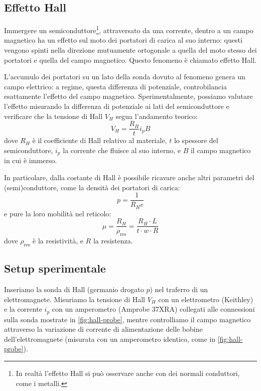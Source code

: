 
\subsection{Effetto Hall}

Immergere un semiconduttore\footnote{In realtà l'effetto Hall si può osservare anche con dei normali conduttori, come i metalli.}, attraversato da una corrente, dentro a un campo magnetico ha un effetto sul moto dei portatori di carica al suo interno: questi vengono spinti nella direzione mutuamente ortogonale a quella del moto stesso dei portatori e quella del campo magnetico.
Questo fenomeno è chiamato effetto Hall.

L'accumulo dei portatori su un lato della sonda dovuto al fenomeno genera un campo elettrico: a regime, questa differenza di potenziale, controbilancia esattamente l'effetto del campo magnetico.
Sperimentalmente, possiamo valutare l'effetto misurando la differenza di potenziale ai lati del semiconduttore e verificare che la tensione di Hall $ V_H $ segua l'andamento teorico:
\begin{equation} \label{eq:hall-tension}
V_H = \frac{R_H}{t} i_p B
\end{equation}
dove $ R_H $ è il coefficiente di Hall relativo al materiale, $ t $ lo spessore del semiconduttore, $ i_p $ la corrente che fluisce al suo interno, e $ B $ il campo magnetico in cui è immerso.

In particolare, dalla costante di Hall è possibile ricavare anche altri parametri del (semi)conduttore, come la densità dei portatori di carica:
\begin{equation}\label{eq:charge-density}
p = \frac{1}{R_H e}
\end{equation}
e pure la loro mobilità nel reticolo:
\begin{equation} \label{eq:charge-mobility}
\mu = \frac{R_H}{\rho_\text{res}} = \frac{R_H \cdot L}{t \cdot w \cdot R}
\end{equation}
dove $ \rho_\text{res} $ è la resistività, e $ R $ la resistenza.

\subsection{Setup sperimentale}

Inseriamo la sonda di Hall (germanio drogato $ p $) nel traferro di un elettromagnete.
Misuriamo la tensione di Hall $ V_H $ con un elettrometro (Keithley) e la corrente $ i_p $ con un amperometro (Amprobe 37XRA) collegati alle connessioni sulla sonda mostrate in \cref{fig:hall-probe}, mentre controlliamo il campo magnetico attraverso la variazione di corrente di alimentazione delle bobine dell'elettromagnete (misurata con un amperometro identico, come in \cref{fig:hall-probe}).

